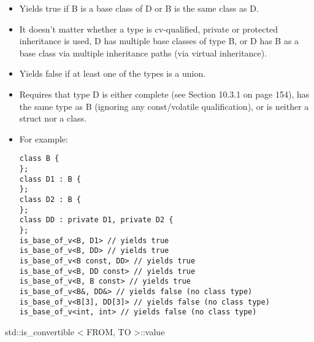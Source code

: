 \begin{itemize}
\item
Yields true if B is a base class of D or B is the same class as D.

\item
It doesn’t matter whether a type is cv-qualified, private or protected inheritance is used, D has multiple base classes of type B, or D has B as a base class via multiple inheritance paths (via virtual
inheritance).

\item
Yields false if at least one of the types is a union.

\item
Requires that type D is either complete (see Section 10.3.1 on page 154), has the same type as B (ignoring any const/volatile qualification), or is neither a struct nor a class.

\item
For example:
\begin{lstlisting}[style=styleCXX]
class B {
};
class D1 : B {
};
class D2 : B {
};
class DD : private D1, private D2 {
};
is_base_of_v<B, D1> // yields true
is_base_of_v<B, DD> // yields true
is_base_of_v<B const, DD> // yields true
is_base_of_v<B, DD const> // yields true
is_base_of_v<B, B const> // yields true
is_base_of_v<B&, DD&> // yields false (no class type)
is_base_of_v<B[3], DD[3]> // yields false (no class type)
is_base_of_v<int, int> // yields false (no class type)
\end{lstlisting}
\end{itemize}

std::is\_convertible < FROM, TO >::value

